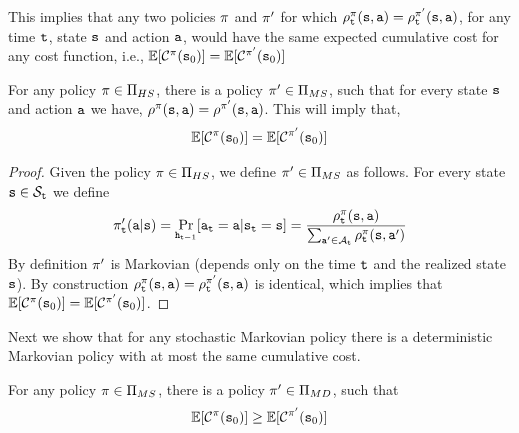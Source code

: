 This implies that any two policies $\pi$ and $\pi'$ for
which
$\rho^\pi_{\tt t}({\tt s},{\tt a})=\rho^{\pi'}_{\tt t}({\tt s},{\tt a})$,
for any time ${\tt t}$, state ${\tt s}$ and action ${\tt a}$, would
have the same expected cumulative cost for any cost function, i.e.,
$\mathbb{E}[\mathcal{C}^\pi({\tt s}_0)]=\mathbb{E}[\mathcal{C}^{\pi'}({\tt s}_0)]$



\begin{theorem}
\label{chp2:HS-MS}
For any policy $\pi\in \Pi_{HS}$, there is a policy
$\pi'\in\Pi_{MS}$, such that for every state ${\tt s}$ and action
${\tt a}$ we have,
$\rho^{\pi}({\tt s},{\tt a})=\rho^{\pi'}({\tt s},{\tt a})$.
This will imply that,
\[
\mathbb{E}[\mathcal{C}^\pi({\tt s}_0)]=\mathbb{E}[\mathcal{C}^{\pi'}({\tt s}_0)]
\]
\end{theorem}

\begin{proof}
Given the policy  $\pi\in \Pi_{HS}$, we define
$\pi'\in\Pi_{MS}$ as follows. For every state ${\tt s}\in
\mathcal{S}_{\tt t}$ we define
\[
\pi'_{\tt t}({\tt a}|{\tt s})=\Pr_{{\tt h}_{{\tt t}-1}}
[{\tt a}_{\tt t}={\tt a}|{\tt s}_{\tt t}={\tt s}]=\frac{\rho^\pi_{\tt t}({\tt s},{\tt a})}{\sum_{{\tt a}'\in
\mathcal{A}_{\tt t}} \rho^\pi_{\tt t}({\tt s},{\tt a}')}
\]
By definition $\pi'$ is Markovian (depends only on the time
${\tt t}$ and the realized state ${\tt s}$). By construction
$\rho_{\tt t}^{\pi}({\tt s},{\tt a})=\rho_{\tt t}^{\pi'}({\tt s},{\tt a})$
is identical, which implies that
$\mathbb{E}[\mathcal{C}^\pi({\tt s}_0)]=\mathbb{E}[\mathcal{C}^{\pi'}({\tt s}_0)]$.
\end{proof}

Next we show that for any stochastic Markovian policy there is a
deterministic Markovian policy with at most the same cumulative
cost.

\begin{theorem}
\label{chp2:stochastic-deterministic}
For any policy $\pi\in \Pi_{MS}$, there is a policy
$\pi'\in\Pi_{MD}$, such that
\[
\mathbb{E}[\mathcal{C}^\pi({\tt s}_0)]\geq \mathbb{E}[\mathcal{C}^{\pi'}({\tt s}_0)]
\]
\end{theorem}

